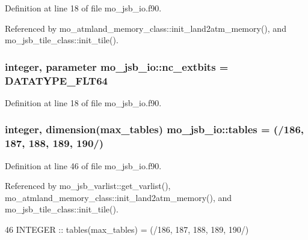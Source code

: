Definition at line 18 of file mo\+\_\+jsb\+\_\+io.\+f90.



Referenced by mo\+\_\+atmland\+\_\+memory\+\_\+class\+::init\+\_\+land2atm\+\_\+memory(), and mo\+\_\+jsb\+\_\+tile\+\_\+class\+::init\+\_\+tile().

\hypertarget{namespacemo__jsb__io_ab5ba0ea9f2dcab7f2a4adf01e662d3c2}{}
\subsubsection[{nc\+\_\+extbits}]{\setlength{\rightskip}{0pt plus 5cm}integer, parameter mo\+\_\+jsb\+\_\+io\+::nc\+\_\+extbits = D\+A\+T\+A\+T\+Y\+P\+E\+\_\+\+F\+L\+T64}\label{namespacemo__jsb__io_ab5ba0ea9f2dcab7f2a4adf01e662d3c2}


Definition at line 18 of file mo\+\_\+jsb\+\_\+io.\+f90.

\hypertarget{namespacemo__jsb__io_aefd9f08b763f8c7b6f4cdbc576e3dd14}{}
\subsubsection[{tables}]{\setlength{\rightskip}{0pt plus 5cm}integer, dimension({\bf max\+\_\+tables}) mo\+\_\+jsb\+\_\+io\+::tables = (/186, 187, 188, 189, 190/)}\label{namespacemo__jsb__io_aefd9f08b763f8c7b6f4cdbc576e3dd14}


Definition at line 46 of file mo\+\_\+jsb\+\_\+io.\+f90.



Referenced by mo\+\_\+jsb\+\_\+varlist\+::get\+\_\+varlist(), mo\+\_\+atmland\+\_\+memory\+\_\+class\+::init\+\_\+land2atm\+\_\+memory(), and mo\+\_\+jsb\+\_\+tile\+\_\+class\+::init\+\_\+tile().


\begin{DoxyCode}
46   \textcolor{keywordtype}{INTEGER} :: tables(max\_tables) = (/186, 187, 188, 189, 190/)
\end{DoxyCode}
